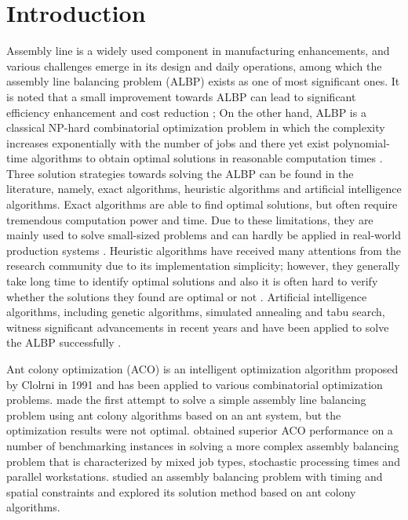 
\section{Introduction}
Assembly line is a widely used component in manufacturing enhancements, and various challenges emerge in its design and daily operations, among which the assembly line balancing problem (ALBP) exists as one of most significant ones.
It is noted that a small improvement towards ALBP can lead to significant efficiency enhancement and cost reduction \citep{salveson1};
On the other hand, ALBP is a classical NP-hard combinatorial optimization problem in which the complexity increases exponentially with the number of jobs and there yet exist polynomial-time algorithms to obtain optimal solutions in reasonable computation times \citep{kilincci2}.
Three solution strategies towards solving the ALBP can be found in the literature, namely, exact algorithms, heuristic algorithms and artificial intelligence algorithms.
Exact algorithms are able to find optimal solutions, but often require tremendous computation power and time.
Due to these limitations, they are mainly used to solve small-sized problems and can hardly be applied in real-world production systems \citep{scholl3, peeter4}.
Heuristic algorithms have received many attentions from the research community due to its implementation simplicity; however, they generally take long time to identify optimal solutions and also it is often hard to verify whether the solutions they found are optimal or not \citep{ponnambalam5}.
Artificial intelligence algorithms, including genetic algorithms, simulated annealing and tabu search, witness significant advancements in recent years and have been applied to solve the ALBP successfully \citep{azcan6, azcan7}.

Ant colony optimization (ACO) is an intelligent optimization algorithm proposed by Clolrni \citep{inproceedings8} in 1991 and has been applied to various combinatorial optimization problems.
\citet{bautista9} made the first attempt to solve a simple assembly line balancing problem using ant colony algorithms based on an ant system, but the optimization results were not optimal.
\citet{patrick10} obtained superior ACO performance on a number of benchmarking instances in solving a more complex assembly balancing problem that is characterized by mixed job types, stochastic processing times and parallel workstations.
\citet{bautista11} studied an assembly balancing problem with timing and spatial constraints and explored its solution method based on ant colony algorithms.

